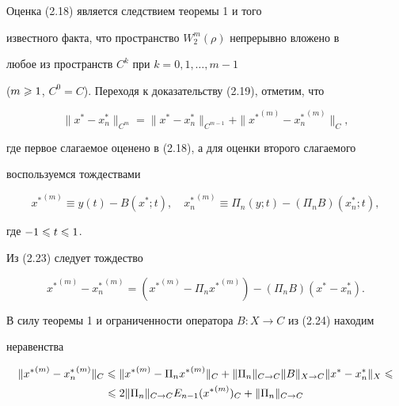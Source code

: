 \begin{pf}


Оценка (2.18) является следствием теоремы 1 и того 


известного факта, что пространство $W_2^m(\rho)$ непрерывно вложено в 


любое из пространств $C^k$ при $k = 0,1,\dotsc, m-1$


($m\geqslant 1$, $C^0= C$). Переходя к доказательству (2.19), отметим, что


\begin{equation}


\|x^* - x^*_n\|_{C^m} = \|x^* - x^*_n\|_{C^{m-1}}+


\|{x^*}^{(m)}-{x_n^*}^{(m)}\|_C,


\end{equation}


где первое слагаемое оценено в (2.18), а для оценки второго слагаемого 


воспользуемся тождествами


\begin{equation}


{x^*}^{(m)} \equiv y(t) - B(x^*;t),\quad


{x^*_n}^{(m)} \equiv \Pi_n(y;t) - (\Pi_n B)(x^*_n;t),


\end{equation}


где $-1\leqslant t \leqslant 1$.





Из (2.23) следует тождество


\begin{equation}


{x^*}^{(m)}-{x^*_n}^{(m)} = ({x^*}^{(m)} -


\Pi_n {x^*}^{(m)}) - (\Pi_n B)(x^* - x^*_n).


\end{equation}


В силу теоремы 1 и ограниченности оператора $B:X\to C$ из (2.24) находим 


неравенства


\begin{multline}


\|{x^*}^{(m)}-{x_n^*}^{(m)}\|_C \lea \|{x^*}^{(m)}-\Pi_n{x^*}^{(m)}\|_C +


\|\Pi_n\|_{C\to C} \|B\|_{X\to C}\|x^* - x^*_n\|_X \lea \\


%


\lea 2 \|\Pi_n\|_{C\to C} E_{n-1}({x^*}^{(m)})_C + \|\Pi_n\|_{C\to C}



\end{multline}
\end{pf}
